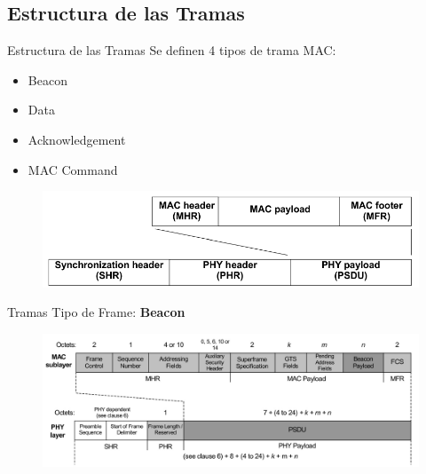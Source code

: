 \documentclass[aspectratio=169]{beamer}
\begin{document}
\subsection[Tramas]{Estructura de las Tramas}

\begin{frame}{Estructura de las Tramas}
Se definen 4 tipos de trama MAC:
\vspace{5px}
	\begin{itemize}
		\item Beacon
		\vspace{5px}
		\item Data
		\vspace{5px}
		\item Acknowledgement
		\vspace{5px}
		\item MAC Command
		\vspace{5px}
	\end{itemize}
	\begin{figure}[H]
		\includegraphics[width=1\textwidth]{./imagenes/frameStructure}
	\end{figure}	 	
\end{frame}

\begin{frame}[t]{Tramas}
Tipo de Frame: \textbf{Beacon}
\vspace{10px}
	\begin{figure}[H]
		\includegraphics[width=1\textwidth]{./imagenes/beacon.jpg}
	\end{figure}	  	  	
\end{frame}
\end{document}
